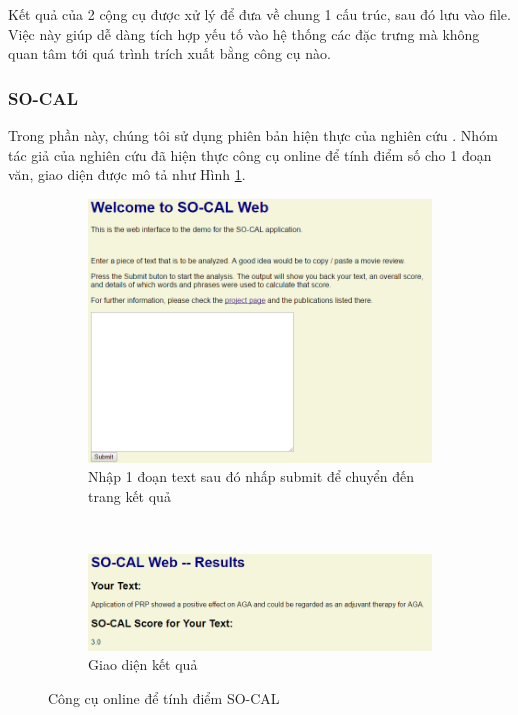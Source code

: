Kết quả của 2 cộng cụ được xử lý để đưa về chung 1 cấu trúc, sau đó lưu vào file. Việc này giúp dễ dàng tích hợp yếu tố vào hệ thống các đặc trưng mà không quan tâm tới quá trình trích xuất bằng công cụ nào.

\subsubsection*{SO-CAL}
Trong phần này, chúng tôi sử dụng phiên bản hiện thực của nghiên cứu \cite{taboada2011lexicon}. Nhóm tác giả của nghiên cứu \cite{taboada2011lexicon} đã hiện thực công cụ online để tính điểm số cho 1 đoạn văn, giao diện được mô tả như Hình \ref{fig:socal}.
\begin{figure}[H]
\centering
\begin{subfigure}[b]{0.4\textwidth}
\includegraphics[scale=0.3]{../hinh/socal.png}
\caption{Nhập 1 đoạn text sau đó nhấp submit để chuyển đến trang kết quả}
\end{subfigure}
~
\begin{subfigure}[b]{0.4\textwidth}
\includegraphics[scale=0.3]{../hinh/socal_result.png}
 \caption{Giao diện kết quả}
\end{subfigure}
\caption{Công cụ online để tính điểm SO-CAL} \label{fig:socal}
\end{figure}

